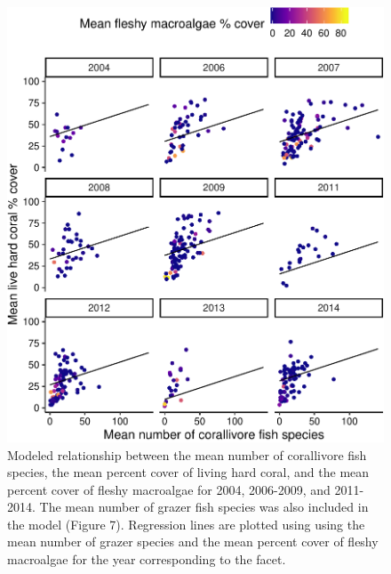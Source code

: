 \documentclass[12pt,]{article}
\begin{document}
\begin{figure}

{\centering \includegraphics{Mullaney_ENV872_Project_files/figure-latex/Coral Percent Cover Plot (Corallivores)-1} 

}

\caption{Modeled relationship between the mean number of corallivore fish species, the mean percent cover of living hard coral, and the mean percent cover of fleshy macroalgae for 2004, 2006-2009, and 2011-2014. The mean number of grazer fish species was also included in the model (Figure 7). Regression lines are plotted using using the mean number of grazer species and the mean percent cover of fleshy macroalgae for the year corresponding to the facet.}\label{fig:Coral Percent Cover Plot (Corallivores)}
\end{figure}
\end{document}
